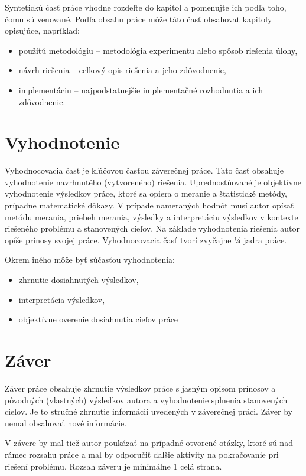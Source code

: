 Syntetickú časť práce vhodne rozdeľte do kapitol a pomenujte ich podľa toho, čomu sú venované. Podľa obsahu práce môže táto časť obsahovať kapitoly opisujúce, napríklad:

\begin{itemize}
  \item použitú metodológiu -- metodológia experimentu alebo spôsob riešenia úlohy,
  \item návrh riešenia -- celkový opis riešenia a jeho zdôvodnenie,
  \item implementáciu -- najpodstatnejšie implementačné rozhodnutia a ich zdôvodnenie.
\end{itemize}


\section*{Vyhodnotenie}

Vyhodnocovacia časť je kľúčovou časťou záverečnej práce. Tato časť obsahuje vyhodnotenie navrhnutého (vytvoreného) riešenia. Uprednostňované je objektívne vyhodnotenie výsledkov práce, ktoré sa opiera o meranie a štatistické metódy, prípadne matematické dôkazy. V prípade nameraných hodnôt musí autor opísať metódu merania, priebeh merania, výsledky a interpretáciu výsledkov v kontexte riešeného problému a stanovených cieľov. Na základe vyhodnotenia riešenia autor opíše prínosy svojej práce. Vyhodnocovacia časť tvorí zvyčajne ¼ jadra práce. 

Okrem iného môže byť súčasťou vyhodnotenia:
\begin{itemize}
  \item zhrnutie dosiahnutých výsledkov,
  \item interpretácia výsledkov,
  \item objektívne overenie dosiahnutia cieľov práce
\end{itemize}


\section*{Záver}

Záver práce obsahuje zhrnutie výsledkov práce s jasným opisom prínosov a pôvodných (vlastných) výsledkov autora a vyhodnotenie splnenia stanovených cieľov. Je to stručné zhrnutie informácií uvedených v záverečnej práci. Záver by nemal obsahovať nové informácie.

V závere by mal tiež autor poukázať na prípadné otvorené otázky, ktoré sú nad rámec rozsahu práce a mal by odporučiť ďalšie aktivity na pokračovanie pri riešení problému. Rozsah záveru je minimálne 1 celá strana.



